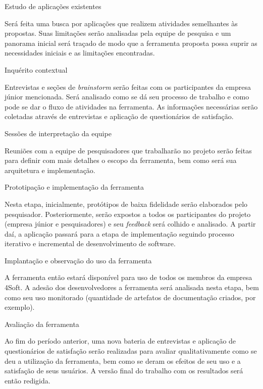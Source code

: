 \begin{description}
   \item Estudo de aplicações existentes

		Será feita uma busca por aplicações que realizem atividades semelhantes às propostas. Suas limitações serão analisadas pela equipe de pesquisa e um panorama inicial será traçado de modo que a ferramenta proposta possa suprir as necessidades iniciais e as limitações encontradas.
    
    \item Inquérito contextual

		Entrevistas e seções de \textit{brainstorm} serão feitas com os participantes da empresa júnior mencionada. Será analisado como se dá seu processo de trabalho e como pode se dar o fluxo de atividades na ferramenta. As informações necessárias serão coletadas através de entrevistas e aplicação de questionários de satisfação.

	\item Sessões de interpretação da equipe

		Reuniões com a equipe de pesquisadores que trabalharão no projeto serão feitas para definir com mais detalhes o escopo da ferramenta, bem como será sua arquitetura e implementação.

	\item Prototipação e implementação da ferramenta

		Nesta etapa, inicialmente, protótipos de baixa fidelidade serão elaborados pelo pesquisador. Posteriormente, serão expostos a todos os participantes do projeto (empresa júnior e pesquisadores) e seu \textit{feedback} será colhido e analisado. A partir daí, a aplicação passará para a etapa de implementação seguindo processo iterativo e incremental de desenvolvimento de software.

	\item Implantação e observação do uso da ferramenta

		A ferramenta então estará disponível para uso de todos os membros da empresa 4Soft. A adesão dos desenvolvedores a ferramenta será analisada nesta etapa, bem como seu uso monitorado (quantidade de artefatos de documentação criados, por exemplo).
        
        
	\item Avaliação da ferramenta

		Ao fim do período anterior, uma nova bateria de entrevistas e aplicação de questionários de satisfação serão realizadas para avaliar qualitativamente como se deu a utilização da ferramenta, bem como se deram os efeitos de seu uso e a satisfação de seus usuários. 
		A versão final do trabalho com os resultados será então redigida.


\end{description}
